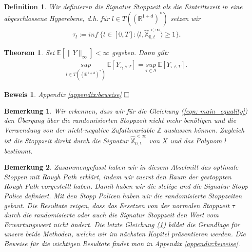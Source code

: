 \documentclass[12pt,titlepage,headsepline]{article}
\newtheorem{definition}{Definition}[section]
\newtheorem{theorem}{Theorem}[section]
\newtheorem*{beweis}{Beweis}
\newtheorem*{bemerkung*}{Bemerkung}
\begin{document}
      \begin{definition}\label{def: class_l}
        Wir definieren die Signatur Stoppzeit als die Eintrittszeit in eine abgeschlossene Hyperebene, d.h. für $l \in T((\mathbb{R}^{1+d})^*)$ setzen wir
        \begin{align*}
          \tau_l := inf \ \bigg\{ t \in [0,T] : \langle l,\hat{\mathbb{X}}^{<\infty}_{0,t}\rangle \geq 1 \bigg\}.
        \end{align*}
      \end{definition}
      \begin{theorem}\label{theorem: main_result}
        Sei $\mathbb{E}[\lVert Y\rVert_\infty]<\infty$ gegeben. Dann gilt:
        \begin{align}\label{eqn: main_equality}
          \underset{l \in T((\mathbb{R}^{1+d})^*)}{sup} \ \mathbb{E}[Y_{\tau_l \land T}] = \underset{\tau \in \mathcal{S}}{sup} \ \mathbb{E}[Y_{\tau \land T}].
        \end{align}
      \end{theorem}
      \begin{beweis}
        \textup{
        Appendix \ref{appendix:beweise}
        }
      $\hfill\Box$
      \end{beweis}
      \begin{bemerkung*}
        \textup{
        Wir erkennen, dass wir für die Gleichung (\ref{eqn: main_equality}) den Übergang über die randomisierten Stoppzeit nicht mehr benötigen und die Verwendung von der nicht-negative Zufallsvariable $\mathbb{Z}$ auslassen können. Zugleich ist die Stoppzeit direkt durch die Signatur $\hat{\mathbb{X}}^{<\infty}_{0,t}$ von $X$ und das Polynom $l$ bestimmt.
        }
      \end{bemerkung*}
      \begin{bemerkung*}
        \textup{
        Zusammengefasst haben wir in diesem Abschnitt das optimale Stoppen mit Rough Path erklärt, indem wir zuerst den Raum der gestoppten Rough Path vorgestellt haben. Damit haben wir die stetige und die Signatur Stopp Police definiert. Mit den Stopp Policen haben wir die randomisierte Stoppzeiten gebaut. Die Resultate zeigen, dass das Ersetzen von der \textit{normalen} Stoppzeit  $\tau$ durch die randomisierte oder auch die Signatur Stoppzeit den Wert vom Erwartungswert nicht ändert. Die letzte Gleichung (\ref{theorem: main_result}) bildet die Grundlage für unsere beide Methoden, welche wir im nächsten Kapitel präsentieren werden. Die Beweise für die wichtigen Resultate findet man in Appendix \ref{appendix:beweise}.
        }
      \end{bemerkung*}
      \newpage
\end{document}
